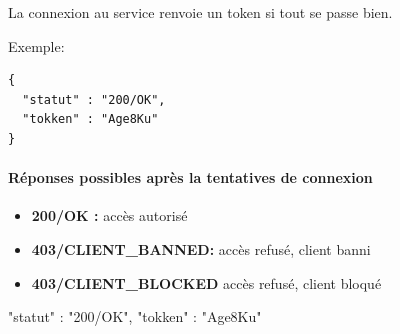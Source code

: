 \documentclass{report}
\begin{document}
La connexion au service renvoie un token si tout se passe bien.

Exemple:
\begin{verbatim}
{
  "statut" : "200/OK",
  "tokken" : "Age8Ku"
}
\end{verbatim}

\paragraph{Réponses possibles après la tentatives de connexion}

\begin{itemize}
	\item \textbf{200/OK :} accès autorisé
	\item \textbf{403/CLIENT_BANNED:} accès refusé, client banni
	\item \textbf{403/CLIENT_BLOCKED} accès refusé, client bloqué
\end{itemize}
{
  "statut" : "200/OK",
  "tokken" : "Age8Ku"
}
\end{document}
